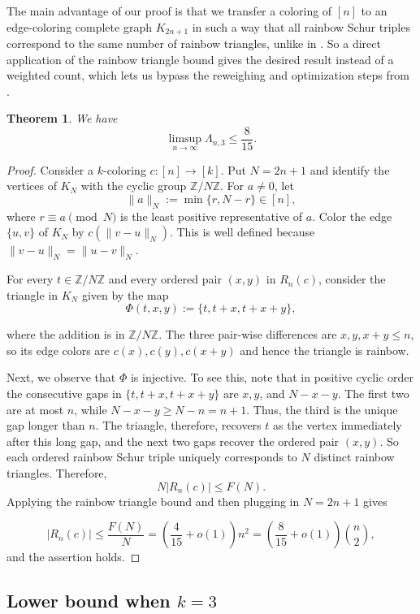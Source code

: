 \documentclass[11pt]{article}
\theoremstyle{plain}
\newtheorem{theorem}{Theorem}[section]
\numberwithin{equation}{section}
\newcommand{\Z}{\mathbb Z}
\begin{document}
The main advantage of our proof is that we transfer a coloring of $[n]$ to an edge-coloring complete graph $K_{2n+1}$ in such a way that all rainbow Schur triples correspond to the same number of rainbow triangles, unlike in \cite{Parczyk_Spiegel_2026}. So a direct application of the rainbow triangle bound gives the desired result instead of a weighted count, which lets us bypass the reweighing and optimization steps from \cite{Parczyk_Spiegel_2026}.

\begin{theorem}\label{thm:upper_bound_3_color} We have 
\[\limsup_{n\to \infty} \Lambda_{n,3} \le \frac{8}{15}.\]
\end{theorem}

\begin{proof}
Consider a $k$-coloring $c:[n]\to[k]$. Put $N=2n+1$ and identify
the vertices of $K_N$ with the cyclic group $\Z/N\Z$.  For
$a\ne0$, let
\[
 \|a\|_N:=\min\{r,N-r\}\in[n],
\]
where $r \equiv a \pmod N$ is the least positive representative of $a$. Color the edge
$\{u,v\}$ of $K_N$ by
\(c(\|v-u\|_N).\) This is well defined because $\|v-u\|_N=\|u-v\|_N$. 

For every $t\in\Z/N\Z$ and every ordered pair $(x,y)$ in $R_{n}(c)$, consider the triangle in $K_{N}$ given by the map
\[
 \Phi(t,x,y):=\{t,t+x,t+x+y\},
\]

where the addition is in $\Z/N\Z$. The three pair-wise differences are $x,y,x+y\le n$, so its edge colors are
$c(x),c(y),c(x+y)$ and hence the triangle is rainbow. 

Next, we observe that $\Phi$ is injective. To see this, note that in positive cyclic order the consecutive gaps in $\{t,t+x,t+x+y\}$
are \( x, y\), and \(N-x-y.\) The first two are at most $n$, while
$N-x-y\ge N-n=n+1$. Thus, the third is the unique gap longer than
$n$. The triangle, therefore, recovers $t$ as the vertex
immediately after this long gap, and the next two gaps recover the ordered pair $(x,y)$. So each ordered rainbow Schur triple uniquely corresponds to $N$ distinct rainbow triangles. Therefore,
\[
 N |R_n(c)| \le F(N).
\]
Applying the rainbow triangle bound and then plugging in $N=2n+1$ gives

\[
 |R_n(c)|\le\frac{F(N)}{N}
   =\left(\frac{4}{15}+o(1)\right)n^2 = \left(\frac{8}{15}+o(1)\right)\binom{n}{2},
\]
and the assertion holds. 
\end{proof}

\subsection{Lower bound when $k=3$}
\end{document}
